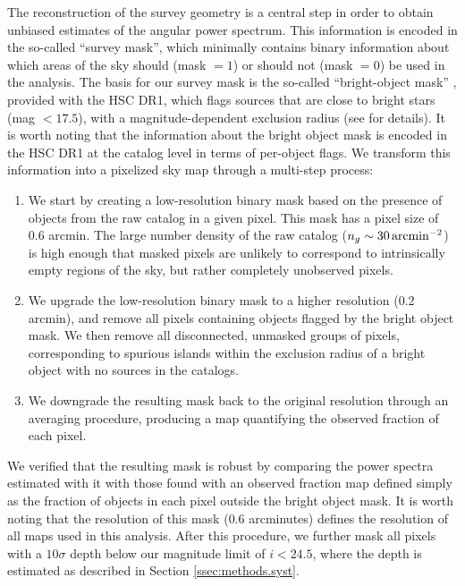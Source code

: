 \documentclass[a4paper,11pt]{article}
\begin{document}
    The reconstruction of the survey geometry is a central step in order to obtain unbiased estimates of the angular power spectrum. This information is encoded in the so-called ``survey mask'', which minimally contains binary information about which areas of the sky should (mask $=1$) or should not (mask $=0$) be used in the analysis. The basis for our survey mask is the so-called ``bright-object mask'' \cite{2018PASJ...70S...7C}, provided with the HSC DR1, which flags sources that are close to bright stars (mag $<17.5$), with a magnitude-dependent exclusion radius (see \cite{2018PASJ...70S...7C} for details). It is worth noting that the information about the bright object mask is encoded in the HSC DR1 at the catalog level in terms of per-object flags. We transform this information into a pixelized sky map through a multi-step process:
    \begin{enumerate}
      \item We start by creating a low-resolution binary mask based on the presence of objects from the raw catalog in a given pixel. This mask has a pixel size of 0.6 arcmin. The large number density of the raw catalog  ($n_g\sim30\,{\rm arcmin}^{-2}$) is high enough that masked pixels are unlikely to correspond to intrinsically empty regions of the sky, but rather completely unobserved pixels.
      \item We upgrade the low-resolution binary mask to a higher resolution (0.2 arcmin), and remove all pixels containing objects flagged by the bright object mask. We then remove all disconnected, unmasked groups of pixels, corresponding to spurious islands within the exclusion radius of a bright object with no sources in the catalogs.
      \item We downgrade the resulting mask back to the original resolution through an averaging procedure, producing a map quantifying the observed fraction of each pixel.
    \end{enumerate}
    We verified that the resulting mask is robust by comparing the power spectra estimated with it with those found with an observed fraction map defined simply as the fraction of objects in each pixel outside the bright object mask. It is worth noting that the resolution of this mask ($0.6$ arcminutes) defines the resolution of all maps used in this analysis. After this procedure, we further mask all pixels with a $10\sigma$ depth below our magnitude limit of $i<24.5$, where the depth is estimated as described in Section \ref{ssec:methods.syst}.
\end{document}

